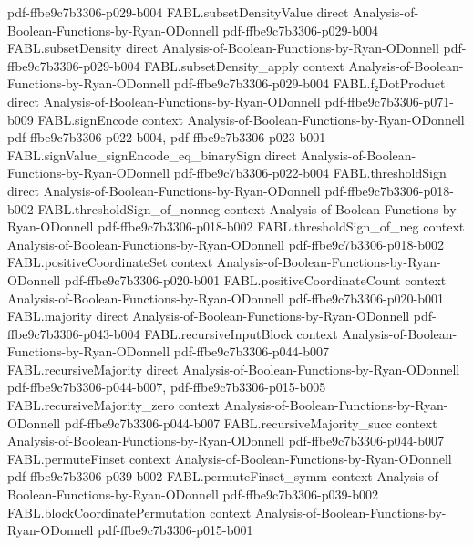 \begin{theorem}
  {pdf-ffbe9c7b3306-p029-b004}
\proofstep
  {FABL.subsetDensityValue}
  {direct}
  {Analysis-of-Boolean-Functions-by-Ryan-ODonnell}
  {pdf-ffbe9c7b3306-p029-b004}
\proofstep
  {FABL.subsetDensity}
  {direct}
  {Analysis-of-Boolean-Functions-by-Ryan-ODonnell}
  {pdf-ffbe9c7b3306-p029-b004}
\proofstep
  {FABL.subsetDensity_apply}
  {context}
  {Analysis-of-Boolean-Functions-by-Ryan-ODonnell}
  {pdf-ffbe9c7b3306-p029-b004}
\proofstep
  {FABL.f₂DotProduct}
  {direct}
  {Analysis-of-Boolean-Functions-by-Ryan-ODonnell}
  {pdf-ffbe9c7b3306-p071-b009}
\proofstep
  {FABL.signEncode}
  {context}
  {Analysis-of-Boolean-Functions-by-Ryan-ODonnell}
  {pdf-ffbe9c7b3306-p022-b004,
    pdf-ffbe9c7b3306-p023-b001}
\proofstep
  {FABL.signValue_signEncode_eq_binarySign}
  {direct}
  {Analysis-of-Boolean-Functions-by-Ryan-ODonnell}
  {pdf-ffbe9c7b3306-p022-b004}
\proofstep
  {FABL.thresholdSign}
  {direct}
  {Analysis-of-Boolean-Functions-by-Ryan-ODonnell}
  {pdf-ffbe9c7b3306-p018-b002}
\proofstep
  {FABL.thresholdSign_of_nonneg}
  {context}
  {Analysis-of-Boolean-Functions-by-Ryan-ODonnell}
  {pdf-ffbe9c7b3306-p018-b002}
\proofstep
  {FABL.thresholdSign_of_neg}
  {context}
  {Analysis-of-Boolean-Functions-by-Ryan-ODonnell}
  {pdf-ffbe9c7b3306-p018-b002}
\proofstep
  {FABL.positiveCoordinateSet}
  {context}
  {Analysis-of-Boolean-Functions-by-Ryan-ODonnell}
  {pdf-ffbe9c7b3306-p020-b001}
\proofstep
  {FABL.positiveCoordinateCount}
  {context}
  {Analysis-of-Boolean-Functions-by-Ryan-ODonnell}
  {pdf-ffbe9c7b3306-p020-b001}
\proofstep
  {FABL.majority}
  {direct}
  {Analysis-of-Boolean-Functions-by-Ryan-ODonnell}
  {pdf-ffbe9c7b3306-p043-b004}
\proofstep
  {FABL.recursiveInputBlock}
  {context}
  {Analysis-of-Boolean-Functions-by-Ryan-ODonnell}
  {pdf-ffbe9c7b3306-p044-b007}
\proofstep
  {FABL.recursiveMajority}
  {direct}
  {Analysis-of-Boolean-Functions-by-Ryan-ODonnell}
  {pdf-ffbe9c7b3306-p044-b007,
    pdf-ffbe9c7b3306-p015-b005}
\proofstep
  {FABL.recursiveMajority_zero}
  {context}
  {Analysis-of-Boolean-Functions-by-Ryan-ODonnell}
  {pdf-ffbe9c7b3306-p044-b007}
\proofstep
  {FABL.recursiveMajority_succ}
  {context}
  {Analysis-of-Boolean-Functions-by-Ryan-ODonnell}
  {pdf-ffbe9c7b3306-p044-b007}
\proofstep
  {FABL.permuteFinset}
  {context}
  {Analysis-of-Boolean-Functions-by-Ryan-ODonnell}
  {pdf-ffbe9c7b3306-p039-b002}
\proofstep
  {FABL.permuteFinset_symm}
  {context}
  {Analysis-of-Boolean-Functions-by-Ryan-ODonnell}
  {pdf-ffbe9c7b3306-p039-b002}
\proofstep
  {FABL.blockCoordinatePermutation}
  {context}
  {Analysis-of-Boolean-Functions-by-Ryan-ODonnell}
  {pdf-ffbe9c7b3306-p015-b001}

\end{theorem}
